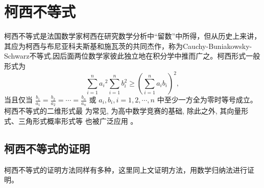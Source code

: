 \chapter{柯西不等式}

柯西不等式是法国数学家柯西在研究数学分析中“留数”中所得，但从历史上来讲，其应为柯西与布尼亚科夫斯基和施瓦茨的共同杰作，称为Cauchy-Buniakowsky-Schwarz不等式,因后面两位数学家彼此独立地在积分学中推而广之。柯西形式一般形式为 \[\sum_{i=1}^{n} a_{i}{ }^{2} \sum_{i=1}^{n} b_{i}^{2} \geq\left(\sum_{i=1}^{n} a_{i} b_{i}\right)^{2},\] 当且仅当 $\frac{b_{1}}{a_{1}}=\frac{b_{2}}{a_{2}}=\cdots=\frac{b_{n}}{a_{n}}$ 或 $a_{i},  b_{i},i=1,2, \cdots, n$ 中至少一方全为零时等号成立。柯西不等式的二维形式最 为常见, 为高中数学竞赛的基础, 除此之外, 其向量形式、三角形式概率形式等 也被广泛应用 \parencite{李梦2019数学竞赛中柯西不等式的教学研究} 。


\section{柯西不等式的证明}

柯西不等式的证明方法同样有多种，这里同上文证明方法，用数学归纳法进行证明。

